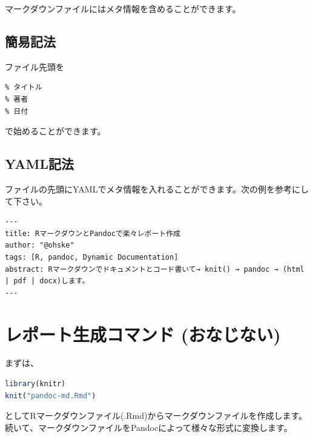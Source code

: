 \documentclass[]{ltjarticle}
\begin{document}
マークダウンファイルにはメタ情報を含めることができます。

\subsection{簡易記法}\label{ux7c21ux6613ux8a18ux6cd5}

ファイル先頭を

\begin{lstlisting}
% タイトル
% 著者
% 日付
\end{lstlisting}

で始めることができます。

\subsection{YAML記法}\label{yamlux8a18ux6cd5}

ファイルの先頭にYAMLでメタ情報を入れることができます。次の例を参考にして下さい。

\begin{lstlisting}
---
title: RマークダウンとPandocで楽々レポート作成
author: "@ohske"
tags: [R, pandoc, Dynamic Documentation]
abstract: Rマークダウンでドキュメントとコード書いて→ knit() → pandoc → (html | pdf | docx)します。
---
\end{lstlisting}

\section{レポート生成コマンド
(おなじない)}\label{ux30ecux30ddux30fcux30c8ux751fux6210ux30b3ux30deux30f3ux30c9-ux304aux306aux3058ux306aux3044}

まずは、

\begin{lstlisting}[language=R]
library(knitr)
knit("pandoc-md.Rmd")
\end{lstlisting}

としてRマークダウンファイル(.Rmd)からマークダウンファイルを作成します。
続いて、マークダウンファイルをPandocによって様々な形式に変換します。
\end{document}
